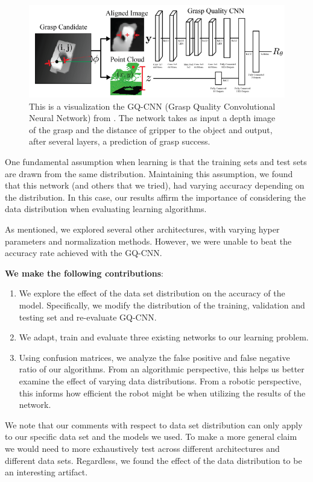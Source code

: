 \begin{figure}[t!]
    \includegraphics[width=0.99\columnwidth]{figs/dexnet.PNG}
\caption{This is a visualization the GQ-CNN (Grasp Quality Convolutional Neural Network) from \cite{mahler2017dex}. The network takes as input a depth image of the grasp and the distance of gripper to the object and output, after several layers, a prediction of grasp success.} \label{fig:dexnet_network}
\end{figure}

One fundamental assumption when learning is that the training sets and test sets are drawn from the same distribution. 
Maintaining this assumption, we found that this network (and others that we tried), had varying accuracy depending on the distribution. 
In this case, our results affirm the importance of considering the data distribution when evaluating learning algorithms. 

As mentioned, we explored several other architectures, with varying hyper parameters and normalization methods. 
However, we were unable to beat the accuracy rate achieved with the GQ-CNN. 

\textbf{We make the following contributions}:
\begin{enumerate}
    \item We explore the effect of the data set distribution on the accuracy of the model. Specifically, we modify the distribution of the training, validation and testing set and re-evaluate GQ-CNN.
		\item We adapt, train and evaluate three existing networks to our learning problem. 
		\item Using confusion matrices, we analyze the false positive and false negative ratio of our algorithms. From an algorithmic perspective, this helps us better examine the effect of varying data distributions. From a robotic perspective, this informs how efficient the robot might be when utilizing the results of the network. 
\end{enumerate}

We note that our comments with respect to data set distribution can only apply to our specific data set and the models we used. 
To make a more general claim we would need to more exhaustively test across different architectures and different data sets. 
Regardless, we found the effect of the data distribution to be an interesting artifact. 

